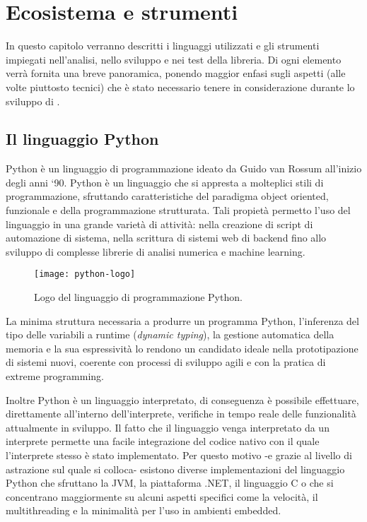 \chapter{Ecosistema e strumenti}
\label{ch:ecosistema}
In questo capitolo verranno descritti i linguaggi utilizzati e gli
strumenti impiegati nell'analisi, nello sviluppo e nei test della libreria.
Di ogni elemento verrà fornita una breve panoramica, ponendo
maggior enfasi sugli aspetti (alle volte piuttosto tecnici) che è
stato necessario tenere in considerazione durante lo sviluppo
di \pygfa.

\section{Il linguaggio Python}
\nocite{wiki-python}
Python è un linguaggio di programmazione ideato da Guido van Rossum
all'inizio degli anni `90. Python è un linguaggio che si appresta a molteplici
stili di programmazione, sfruttando caratteristiche del paradigma object
oriented, funzionale e della programmazione strutturata.
Tali propietà permetto l'uso del linguaggio in una grande varietà di attività:
nella creazione di script di automazione di sistema, nella scrittura di
sistemi web di backend fino allo sviluppo di complesse librerie di analisi numerica
e machine learning.

\begin{wrapfigure} {O} {0.35\textwidth}
	\begin{centering}	
		\texttt{[image: python-logo]}
		\caption[Logo Python]{Logo del linguaggio di programmazione Python.}
	\end{centering}
\end{wrapfigure}
La minima struttura necessaria a produrre un programma Python,
l'inferenza del tipo delle variabili a runtime (\emph{dynamic typing}),
la gestione automatica della memoria e la sua espressività lo rendono
un candidato ideale nella prototipazione di sistemi nuovi, coerente con
processi di sviluppo agili e con la pratica di extreme programming.

Inoltre Python è un linguaggio interpretato, di conseguenza è possibile
effettuare, direttamente all'interno dell'interprete, verifiche in tempo
reale delle funzionalità attualmente in sviluppo.
Il fatto che il linguaggio venga interpretato
da un interprete permette una facile integrazione del codice nativo
con il quale l'interprete stesso è stato implementato.
Per questo motivo -e grazie al livello di astrazione sul quale si colloca-
esistono diverse implementazioni del linguaggio Python
che sfruttano la JVM, la piattaforma .NET, il linguaggio C o che si
concentrano maggiormente su alcuni aspetti specifici come la velocità,
il multithreading e la minimalità per l'uso in ambienti embedded.

